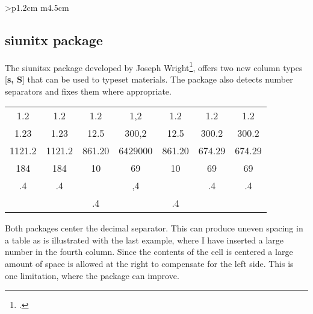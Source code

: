 \begin{tabular}{>{\bfseries}p{1.2cm} m{4.5cm}}

\subsection{siunitx package}

The siunitsx package developed by Joseph Wright\footcite{siunitx}, offers two new column types [\textbf{s, S}] that can be used to typeset materials. The package also detects number separators and fixes them where appropriate.

\begin{tabular}{|S |S |S |S |S |S |S|}
 1.2     & 1.2   		&1.2    		&1,2    	&1.2    	&1.2	    &1.2     \\
 1.23   	& 1.23  		&12.5   		&300,2   &12.5   	&300.2	  &300.2   \\
 1121.2	& 1121.2	  &861.20 	  &6429000 &861.20  &674.29  &674.29  \\
 184    	& 184   		&10     		&69     	&10     	&69	     &69      \\
 .4      & .4    		&       		&,4     	&       	&.4 	     &.4     \\
         &       		&.4     		&		    &.4     	&		     & 
\end{tabular}

Both packages center the decimal separator. This can produce uneven spacing in a table as is illustrated with the last example, where I have inserted a large number in the fourth column. Since the contents of the cell is centered a large amount of space is allowed at the right to compensate for the left side. This is one limitation, where the package can improve. 
 

\end{tabular}
